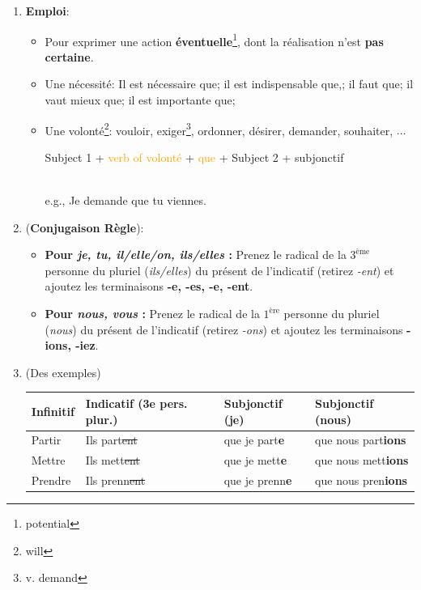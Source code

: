 \documentclass[math,code]{amznotes}
\theoremstyle{remark}
\begin{document}
\begin{enumerate}
    \item \textbf{Emploi}:
    \begin{itemize}
        \item Pour exprimer une action \textbf{éventuelle}\footnote{potential}, dont la réalisation n'est \textbf{pas certaine}.
        \item Une nécessité: Il est nécessaire que; il est indispensable que,; il faut que; il vaut mieux que; il est importante que;
        \item Une volonté\footnote{will}: vouloir, exiger\footnote{v. demand}, ordonner, désirer, demander, souhaiter, $\dots$ \\
        \centerline{Subject 1 + \textcolor{orange}{verb of volonté} + \textcolor{orange}{que} + Subject 2 + subjonctif} \\
        e.g., Je demande que tu viennes.
    \end{itemize}
    \item (\textbf{Conjugaison Règle}): 
    \begin{itemize}
        \item \textbf{Pour \textit{je, tu, il/elle/on, ils/elles} :} Prenez le radical de la $3^{\text{ème}}$ personne du pluriel (\textit{ils/elles}) du présent de l'indicatif (retirez \textit{-ent}) et ajoutez les terminaisons \textbf{-e, -es, -e, -ent}.
        \item \textbf{Pour \textit{nous, vous} :} Prenez le radical de la $1^{\text{ère}}$ personne du pluriel (\textit{nous}) du présent de l'indicatif (retirez \textit{-ons}) et ajoutez les terminaisons \textbf{-ions, -iez}.
    \end{itemize}
    \item (Des exemples)
    \begin{table}[h]
    \centering
    \begin{tabular}{|l|l|l|l|}
        \hline
        \textbf{Infinitif} & \textbf{Indicatif (3e pers. plur.)} & \textbf{Subjonctif (je)} & \textbf{Subjonctif (nous)} \\
        \hline
        Partir & Ils part\sout{ent} & que je part\textbf{e} & que nous part\textbf{ions} \\
        \hline
        Mettre & Ils mett\sout{ent} & que je mett\textbf{e} & que nous mett\textbf{ions} \\
        \hline
        Prendre & Ils prenn\sout{ent} & que je prenn\textbf{e} & que nous pren\textbf{ions} \\
        \hline

\end{tabular}
\end{table}
\end{enumerate}
\end{document}
